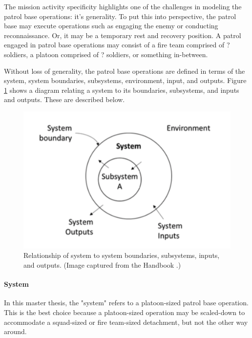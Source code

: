 \documentclass[../../main/main.tex]{subfiles}
\begin{document}
The mission activity specificity highlights one of the challenges in modeling the patrol base operations: it's generality.  To put this into perspective, the patrol base may execute operations such as engaging the enemy or conducting reconnaissance.  Or, it may be a temporary rest and recovery position.  A patrol engaged in patrol base operations may consist of a fire team comprised of ? soldiers, a platoon comprised of ? soldiers, or something in-between. 

Without loss of generality, the patrol base operations are defined in terms of the system, system boundaries, subsystems, environment, input, and outputs.  Figure \ref{system} shows a diagram relating a system to its boundaries, subsystems, and inputs and outputs.  These are described below.

\begin{figure}[h]
\includegraphics[width=\linewidth]{../figures/system}
\caption{\label{system} Relationship of system to system boundaries, subsystems, inputs, and outputs. (Image captured from the  Handbook \cite{stpa}.)}
\end{figure}
\paragraph*{System}
In this master thesis, the "system" refers to a platoon-sized patrol base operation.  This is the best choice because a platoon-sized operation may be scaled-down to accommodate a squad-sized or fire team-sized detachment, but not the other way around. 
\end{document}
